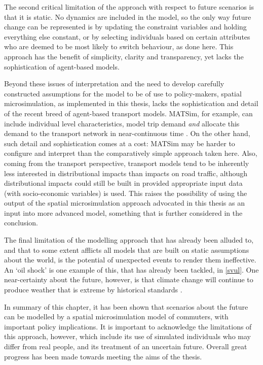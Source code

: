 \documentclass[a4paper, 11pt, twoside]{Thesis}
\begin{document}
The second critical limitation of the approach with respect to future scenarios
is that it is static. No dynamics are included in the model, so the only way future
change can be represented is by updating the constraint variables and holding
everything else constant, or by selecting individuals based on certain attributes
who are deemed to be most likely to switch behaviour, as done here. This approach
has the benefit of simplicity, clarity and transparency, yet lacks the sophistication
of agent-based models.

Beyond these issues of interpretation and the need to develop carefully constructed
assumptions for the model to be of use to policy-makers, spatial
microsimulation, as implemented in this thesis, lacks the sophistication and
detail of the recent breed of agent-based transport models. MATSim, for example,
can include individual level characteristics, model trip demand \emph{and}
allocate
this demand to the transport network in near-continuous time \citep{Balmer2009}.
On the other hand, such detail and sophistication comes at a cost: MATSim
may be harder to configure and interpret than the comparatively simple approach
taken here. Also, coming from the transport perspective, transport models
tend to be inherently less interested in distributional impacts than impacts
on road traffic, although distributional impacts could still be built in
provided appropriate input data (with socio-economic variables) is used.
This raises the possibility of using the output of the spatial microsimulation
approach advocated in this thesis as an input into more advanced model,
something that is further considered in the conclusion.

The final limitation of the modelling approach that has already been alluded to,
and that to some extent afflicts all models that are built on static
assumptions about the world, is the potential of unexpected events to render
them ineffective. An `oil shock' is one example of this, that has already been
tackled, in \cref{svul}. One near-certainty about the future, however, is
that climate change will continue to produce weather that is extreme by
historical standards \citep{Koetse2009}.


In summary of this chapter, it has been shown that
scenarios about the future can
be modelled by a spatial microsimulation model of commuters, with important
policy implications. It is important to acknowledge the limitations of this
approach, however, which include its use of simulated individuals who
may differ from real people, and its treatment of an uncertain future.
Overall great progress has been made towards meeting the aims of the thesis.
\end{document}

